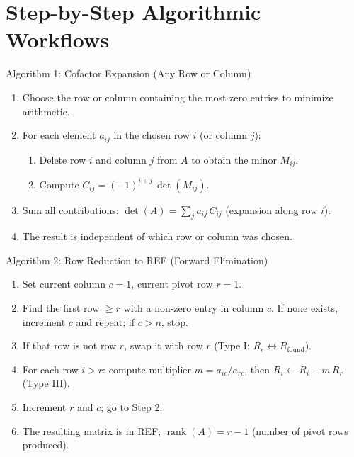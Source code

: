 \documentclass[12pt,a4paper]{article}
\begin{document}
\section{Step-by-Step Algorithmic Workflows}

\begin{infobox}{Algorithm 1: Cofactor Expansion (Any Row or Column)}
\begin{enumerate}[label=\arabic*.]
  \item Choose the row or column containing the most zero entries to minimize arithmetic.
  \item For each element $a_{ij}$ in the chosen row $i$ (or column $j$):
    \begin{enumerate}[label=(\alph*)]
      \item Delete row $i$ and column $j$ from $A$ to obtain the minor $M_{ij}$.
      \item Compute $C_{ij} = (-1)^{i+j}\,\det(M_{ij})$.
    \end{enumerate}
  \item Sum all contributions: $\det(A) = \sum_j a_{ij}\,C_{ij}$ (expansion along row $i$).
  \item The result is independent of which row or column was chosen.
\end{enumerate}
\end{infobox}

\begin{infobox}{Algorithm 2: Row Reduction to REF (Forward Elimination)}
\begin{enumerate}[label=\arabic*.]
  \item Set current column $c = 1$, current pivot row $r = 1$.
  \item Find the first row $\geq r$ with a non-zero entry in column $c$.
        If none exists, increment $c$ and repeat; if $c > n$, stop.
  \item If that row is not row $r$, swap it with row $r$ (Type I: $R_r \leftrightarrow R_{\text{found}}$).
  \item For each row $i > r$: compute multiplier $m = a_{ic}/a_{rc}$, then $R_i \leftarrow R_i - m\,R_r$ (Type III).
  \item Increment $r$ and $c$; go to Step 2.
  \item The resulting matrix is in REF; $\operatorname{rank}(A) = r - 1$ (number of pivot rows produced).
\end{enumerate}
\end{infobox}
\end{document}
